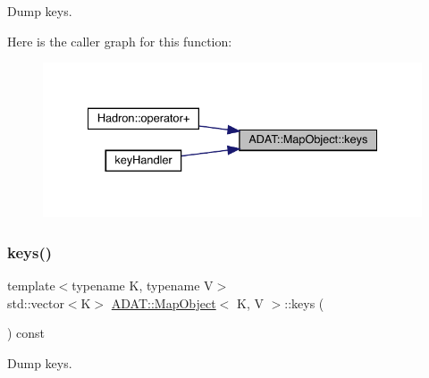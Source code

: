 Dump keys. 

Here is the caller graph for this function\+:
\nopagebreak
\begin{figure}[H]
\begin{center}
\leavevmode
\includegraphics[width=334pt]{da/d29/classADAT_1_1MapObject_af767d0e9da82e3a249d3340d57da66e1_icgraph}
\end{center}
\end{figure}
\mbox{\label{classADAT_1_1MapObject_af767d0e9da82e3a249d3340d57da66e1}} 
\subsubsection{\texorpdfstring{keys()}{keys()}\hspace{0.1cm}{\footnotesize\ttfamily [3/3]}}
{\footnotesize\ttfamily template$<$typename K, typename V$>$ \\
std\+::vector$<$K$>$ \mbox{\hyperlink{classADAT_1_1MapObject}{A\+D\+A\+T\+::\+Map\+Object}}$<$ K, V $>$\+::keys (\begin{DoxyParamCaption}{ }\end{DoxyParamCaption}) const\hspace{0.3cm}{\ttfamily [inline]}}



Dump keys. 

\mbox{\label{classADAT_1_1MapObject_ab19c1622f3edfd0755e42583e6a48844}} 
